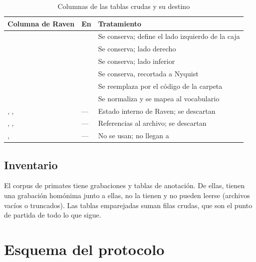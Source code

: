\documentclass[12pt,a4paper]{article}
\begin{document}
\begin{table}[htbp]
    \centering
    \caption{Columnas de las tablas crudas y su destino}
    \label{tab:columnas}
    \small
    \begin{tabular}{@{}L{3.6cm}L{3.6cm}L{7.2cm}@{}}
        \toprule
        \textbf{Columna de Raven} & \textbf{En } & \textbf{Tratamiento} \\
        \midrule
         &  & Se conserva; define el lado izquierdo de la caja \\
         &  & Se conserva; lado derecho \\
         &  & Se conserva; lado inferior \\
         &  & Se conserva, recortada a Nyquist \\
         &  & Se reemplaza por el código de la carpeta \\
         &  & Se normaliza y se mapea al vocabulario \\
        \addlinespace
        , ,  & --- & Estado interno de Raven; se descartan \\
        , ,  & --- & Referencias al archivo; se descartan \\
        ,  & --- & No se usan; no llegan a  \\
        \bottomrule
    \end{tabular}
\end{table}

\subsection{Inventario}

El corpus de primates tiene \nRecordings{} grabaciones y \nTables{} tablas de anotación. De
ellas, \nPaired{} tienen una grabación homónima junto a ellas, \nOrphans{} no la tienen y
\nFailed{} no pueden leerse (archivos vacíos o truncados). Las tablas emparejadas suman
\nRawRows{} filas crudas, que son el punto de partida de todo lo que sigue.

\section{Esquema del protocolo}
\end{document}
